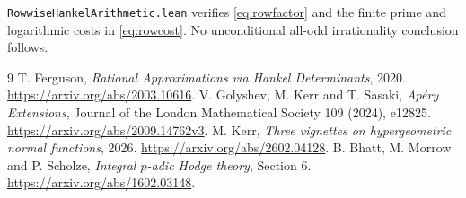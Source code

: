 \documentclass[11pt]{article}
\begin{document}
\noindent
\texttt{RowwiseHankelArithmetic.lean} verifies \eqref{eq:rowfactor} and the
finite prime and logarithmic costs in \eqref{eq:rowcost}.
No unconditional all-odd irrationality conclusion follows.

\begin{thebibliography}{9}
\small
{}
T. Ferguson, \emph{Rational Approximations via Hankel Determinants}, 2020.
\url{https://arxiv.org/abs/2003.10616}.
V. Golyshev, M. Kerr and T. Sasaki,
\emph{Ap\'ery Extensions}, Journal of the London Mathematical Society
109 (2024), e12825.
\url{https://arxiv.org/abs/2009.14762v3}.
M. Kerr, \emph{Three vignettes on hypergeometric normal functions}, 2026.
\url{https://arxiv.org/abs/2602.04128}.
B. Bhatt, M. Morrow and P. Scholze,
\emph{Integral $p$-adic Hodge theory}, Section 6.
\url{https://arxiv.org/abs/1602.03148}.
\end{thebibliography}
\end{document}
